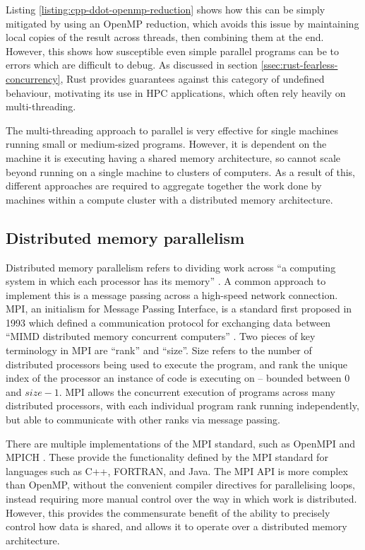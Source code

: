 Listing \ref{listing:cpp-ddot-openmp-reduction} shows how this can be simply mitigated by using an OpenMP reduction, which avoids this issue by maintaining local copies of the result across threads, then combining them at the end. However, this shows how susceptible even simple parallel programs can be to errors which are difficult to debug. As discussed in section \ref{ssec:rust-fearless-concurrency}, Rust provides guarantees against this category of undefined behaviour, motivating its use in \acrshort{HPC} applications, which often rely heavily on multi-threading.

The multi-threading approach to parallel is very effective for single machines running small or medium-sized programs. However, it is dependent on the machine it is executing having a shared memory architecture, so cannot scale beyond running on a single machine to clusters of computers. As a result of this, different approaches are required to aggregate together the work done by machines within a compute cluster with a distributed memory architecture.

\subsection{Distributed memory parallelism}
\label{ssec:distributed-memory-paralellism}

Distributed memory parallelism refers to dividing work across ``a computing system in which each processor has its memory'' \cite{pardo2021modeling}. A common approach to implement this is a message passing across a high-speed network connection. MPI, an initialism for Message Passing Interface, is a standard first proposed in 1993 which defined a communication protocol for exchanging data between ``MIMD distributed memory concurrent computers'' \cite{thempiforumMPIMessagePassing1993}. Two pieces of key terminology in MPI are ``rank'' and ``size''. Size refers to the number of distributed processors being used to execute the program, and rank the unique index of the processor an instance of code is executing on -- bounded between $0$ and $size-1$. MPI allows the concurrent execution of programs across many distributed processors, with each individual program rank running independently, but able to communicate with other ranks via message passing.

There are multiple implementations of the MPI standard, such as OpenMPI \cite{gabriel2004open} and MPICH \cite{gropp1996user}. These provide the functionality defined by the MPI standard for languages such as C++, FORTRAN, and Java. The MPI API is more complex than OpenMP, without the convenient compiler directives for parallelising loops, instead requiring more manual control over the way in which work is distributed. However, this provides the commensurate benefit of the ability to precisely control how data is shared, and allows it to operate over a distributed memory architecture.

